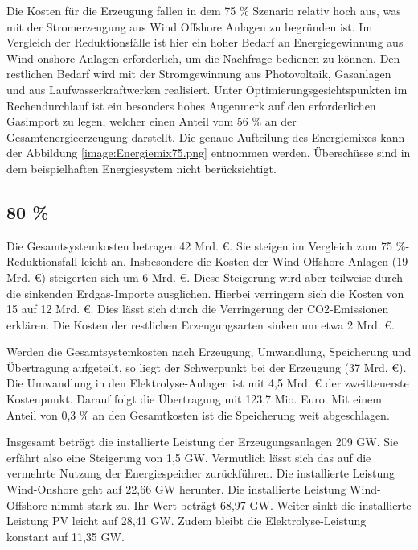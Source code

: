 Die Kosten für die Erzeugung fallen in dem 75 \% Szenario relativ hoch aus, was mit der Stromerzeugung aus Wind Offshore Anlagen zu begründen ist. Im Vergleich der Reduktionsfälle ist hier ein hoher Bedarf an Energiegewinnung aus Wind onshore Anlagen erforderlich, um die Nachfrage bedienen zu können. Den restlichen Bedarf wird mit der Stromgewinnung aus Photovoltaik, Gasanlagen und aus Laufwasserkraftwerken realisiert. Unter Optimierungsgesichtspunkten im Rechendurchlauf ist ein besonders hohes Augenmerk auf den erforderlichen Gasimport zu legen, welcher einen Anteil vom 56 \% an der Gesamtenergieerzeugung darstellt. Die genaue Aufteilung des Energiemixes kann der Abbildung \ref{image:Energiemix75.png} entnommen werden. Überschüsse sind in dem beispielhaften Energiesystem nicht berücksichtigt.
 



\subsection{80 \%}
Die Gesamtsystemkosten betragen 42 Mrd. €. Sie steigen im Vergleich zum 75 \%-Reduktionsfall leicht an. Insbesondere die Kosten der Wind-Offshore-Anlagen (19 Mrd. €) steigerten sich um 6 Mrd. €. Diese Steigerung wird aber teilweise durch die sinkenden Erdgas-Importe ausglichen. Hierbei verringern sich die Kosten von 15 auf 12 Mrd. €. Dies lässt sich durch die Verringerung der CO2-Emissionen erklären. Die Kosten der restlichen Erzeugungsarten sinken um etwa 2 Mrd. €.

Werden die Gesamtsystemkosten nach Erzeugung, Umwandlung, Speicherung und Übertragung aufgeteilt, so liegt der Schwerpunkt bei der Erzeugung (37 Mrd. €). Die Umwandlung in den Elektrolyse-Anlagen ist mit 4,5 Mrd. € der zweitteuerste Kostenpunkt. Darauf folgt die Übertragung mit 123,7 Mio. Euro. Mit einem Anteil von 0,3 \% an den Gesamtkosten ist die Speicherung weit abgeschlagen.

Insgesamt beträgt die installierte Leistung der Erzeugungsanlagen 209 GW. Sie erfährt also eine Steigerung von 1,5 GW. Vermutlich lässt sich das auf die vermehrte Nutzung der Energiespeicher zurückführen. Die installierte Leistung Wind-Onshore geht auf 22,66 GW herunter. Die installierte Leistung Wind-Offshore nimmt stark zu. Ihr Wert beträgt 68,97 GW.  Weiter sinkt die installierte Leistung PV leicht auf 28,41 GW. Zudem bleibt die Elektrolyse-Leistung konstant auf 11,35 GW. 

